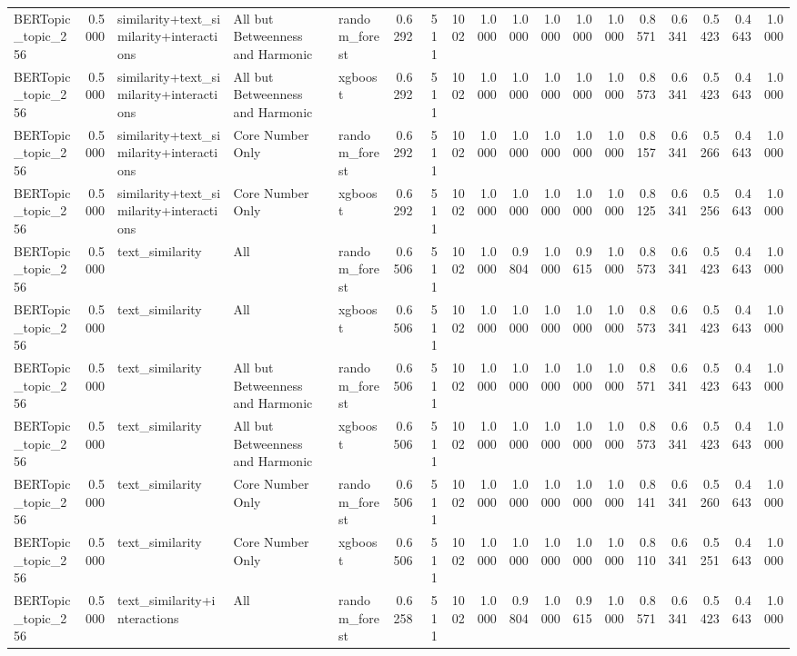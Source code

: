 \begin{tabular}{lrlllrrrrrrrrrrrrr}
BERTopic_topic_256 & 0.5000 & similarity+text_similarity+interactions & All but Betweenness and Harmonic & random_forest & 0.6292 & 511 & 1002 & 1.0000 & 1.0000 & 1.0000 & 1.0000 & 1.0000 & 0.8571 & 0.6341 & 0.5423 & 0.4643 & 1.0000 \\
BERTopic_topic_256 & 0.5000 & similarity+text_similarity+interactions & All but Betweenness and Harmonic & xgboost & 0.6292 & 511 & 1002 & 1.0000 & 1.0000 & 1.0000 & 1.0000 & 1.0000 & 0.8573 & 0.6341 & 0.5423 & 0.4643 & 1.0000 \\
BERTopic_topic_256 & 0.5000 & similarity+text_similarity+interactions & Core Number Only & random_forest & 0.6292 & 511 & 1002 & 1.0000 & 1.0000 & 1.0000 & 1.0000 & 1.0000 & 0.8157 & 0.6341 & 0.5266 & 0.4643 & 1.0000 \\
BERTopic_topic_256 & 0.5000 & similarity+text_similarity+interactions & Core Number Only & xgboost & 0.6292 & 511 & 1002 & 1.0000 & 1.0000 & 1.0000 & 1.0000 & 1.0000 & 0.8125 & 0.6341 & 0.5256 & 0.4643 & 1.0000 \\
BERTopic_topic_256 & 0.5000 & text_similarity & All & random_forest & 0.6506 & 511 & 1002 & 1.0000 & 0.9804 & 1.0000 & 0.9615 & 1.0000 & 0.8573 & 0.6341 & 0.5423 & 0.4643 & 1.0000 \\
BERTopic_topic_256 & 0.5000 & text_similarity & All & xgboost & 0.6506 & 511 & 1002 & 1.0000 & 1.0000 & 1.0000 & 1.0000 & 1.0000 & 0.8573 & 0.6341 & 0.5423 & 0.4643 & 1.0000 \\
BERTopic_topic_256 & 0.5000 & text_similarity & All but Betweenness and Harmonic & random_forest & 0.6506 & 511 & 1002 & 1.0000 & 1.0000 & 1.0000 & 1.0000 & 1.0000 & 0.8571 & 0.6341 & 0.5423 & 0.4643 & 1.0000 \\
BERTopic_topic_256 & 0.5000 & text_similarity & All but Betweenness and Harmonic & xgboost & 0.6506 & 511 & 1002 & 1.0000 & 1.0000 & 1.0000 & 1.0000 & 1.0000 & 0.8573 & 0.6341 & 0.5423 & 0.4643 & 1.0000 \\
BERTopic_topic_256 & 0.5000 & text_similarity & Core Number Only & random_forest & 0.6506 & 511 & 1002 & 1.0000 & 1.0000 & 1.0000 & 1.0000 & 1.0000 & 0.8141 & 0.6341 & 0.5260 & 0.4643 & 1.0000 \\
BERTopic_topic_256 & 0.5000 & text_similarity & Core Number Only & xgboost & 0.6506 & 511 & 1002 & 1.0000 & 1.0000 & 1.0000 & 1.0000 & 1.0000 & 0.8110 & 0.6341 & 0.5251 & 0.4643 & 1.0000 \\
BERTopic_topic_256 & 0.5000 & text_similarity+interactions & All & random_forest & 0.6258 & 511 & 1002 & 1.0000 & 0.9804 & 1.0000 & 0.9615 & 1.0000 & 0.8571 & 0.6341 & 0.5423 & 0.4643 & 1.0000 \\

\end{tabular}
